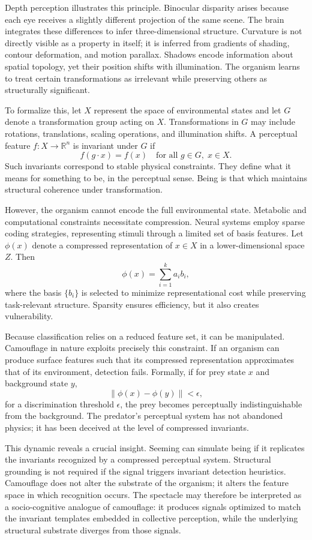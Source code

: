 \documentclass[11pt]{article}
\begin{document}
Depth perception illustrates this principle. Binocular disparity arises because each eye receives a slightly different projection of the same scene. The brain integrates these differences to infer three-dimensional structure. Curvature is not directly visible as a property in itself; it is inferred from gradients of shading, contour deformation, and motion parallax. Shadows encode information about spatial topology, yet their position shifts with illumination. The organism learns to treat certain transformations as irrelevant while preserving others as structurally significant.

To formalize this, let $X$ represent the space of environmental states and let $G$ denote a transformation group acting on $X$. Transformations in $G$ may include rotations, translations, scaling operations, and illumination shifts. A perceptual feature $f : X \to \mathbb{R}^n$ is invariant under $G$ if
\[
f(g \cdot x) = f(x) \quad \text{for all } g \in G, \; x \in X.
\]
Such invariants correspond to stable physical constraints. They define what it means for something to be, in the perceptual sense. Being is that which maintains structural coherence under transformation.

However, the organism cannot encode the full environmental state. Metabolic and computational constraints necessitate compression. Neural systems employ sparse coding strategies, representing stimuli through a limited set of basis features. Let $\phi(x)$ denote a compressed representation of $x \in X$ in a lower-dimensional space $Z$. Then
\[
\phi(x) = \sum_{i=1}^{k} a_i b_i,
\]
where the basis $\{b_i\}$ is selected to minimize representational cost while preserving task-relevant structure. Sparsity ensures efficiency, but it also creates vulnerability.

Because classification relies on a reduced feature set, it can be manipulated. Camouflage in nature exploits precisely this constraint. If an organism can produce surface features such that its compressed representation approximates that of its environment, detection fails. Formally, if for prey state $x$ and background state $y$,
\[
\|\phi(x) - \phi(y)\| < \epsilon,
\]
for a discrimination threshold $\epsilon$, the prey becomes perceptually indistinguishable from the background. The predator's perceptual system has not abandoned physics; it has been deceived at the level of compressed invariants.

This dynamic reveals a crucial insight. Seeming can simulate being if it replicates the invariants recognized by a compressed perceptual system. Structural grounding is not required if the signal triggers invariant detection heuristics. Camouflage does not alter the substrate of the organism; it alters the feature space in which recognition occurs. The spectacle may therefore be interpreted as a socio-cognitive analogue of camouflage: it produces signals optimized to match the invariant templates embedded in collective perception, while the underlying structural substrate diverges from those signals.
\end{document}
